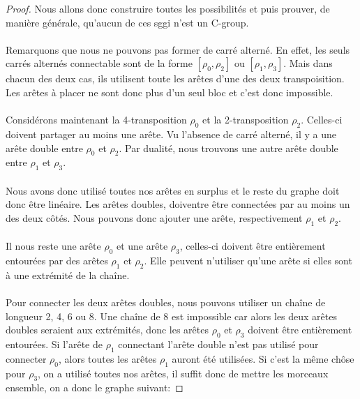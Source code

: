 \begin{proof}
  Nous allons donc construire toutes les possibilités et puis prouver, de manière générale, qu'aucun de ces sggi n'est un C-group.

  \paragraph{}
  Remarquons que nous ne pouvons pas former de carré alterné. En effet, les seuls carrés alternés connectable sont de la forme $[\rho_0, \rho_2]$ ou $[\rho_1, \rho_3]$. Mais dans chacun des deux cas, ils utilisent toute les arêtes d'une des deux transpoisition. Les arêtes à placer ne sont donc plus d'un seul bloc et c'est donc impossible.

  \paragraph{}
  Considérons maintenant la 4-transposition $\rho_0$ et la 2-transposition $\rho_2$. Celles-ci doivent partager au moins une arête. Vu l'absence de carré alterné, il y a une arête double entre $\rho_0$ et $\rho_2$. Par dualité, nous trouvons une autre arête double entre $\rho_1$ et $\rho_3$.

  \paragraph{}
  Nous avons donc utilisé toutes nos arêtes en surplus et le reste du graphe doit donc être linéaire. Les arêtes doubles, doiventre être connectées par au moins un des deux côtés. Nous pouvons donc ajouter une arête, respectivement $\rho_1$ et $\rho_2$.

  \paragraph{}
  Il nous reste une arête $\rho_0$ et une arête $\rho_3$, celles-ci doivent être entièrement entourées par des arêtes $\rho_1$ et $\rho_2$. Elle peuvent n'utiliser qu'une arête si elles sont à une extrémité de la chaîne.

  \paragraph{}
  Pour connecter les deux arêtes doubles, nous pouvons utiliser un chaîne de longueur 2, 4, 6 ou 8. Une chaîne de 8 est impossible car alors les deux arêtes doubles seraient aux extrémités, donc les arêtes $\rho_0$ et $\rho_3$ doivent être entièrement entourées. Si l'arête de $\rho_1$ connectant l'arête double n'est pas utilisé pour connecter $\rho_0$, alors toutes les arêtes $\rho_1$ auront été utilisées. Si c'est la même chôse pour $\rho_3$, on a utilisé toutes nos arêtes, il suffit donc de mettre les morceaux ensemble, on a donc le graphe suivant:


\end{proof}
